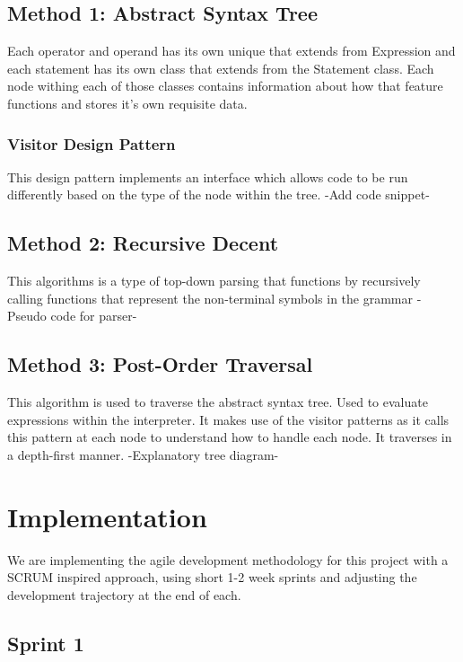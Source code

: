 \documentclass[a4paper, oneside, 11pt]{report}
\begin{document}
\section{Method 1: Abstract Syntax Tree}

Each operator and operand has its own unique that extends from Expression and each
statement has its own class that extends from the Statement class. Each node withing
each of those classes contains information about how that feature functions and stores it’s
own requisite data.

\subsection{Visitor Design Pattern}

This design pattern implements an interface which allows code to be run differently based
on the type of the node within the tree.
-Add code snippet-

\section{Method 2: Recursive Decent}

This algorithms is a type of top-down parsing that functions by recursively calling functions that represent the non-terminal symbols in the grammar
-Pseudo code for parser-

\section{Method 3: Post-Order Traversal}

This algorithm is used to traverse the abstract syntax tree. Used to evaluate expressions
within the interpreter. It makes use of the visitor patterns as it calls this pattern at each
node to understand how to handle each node. It traverses in a depth-first manner.
-Explanatory tree diagram-



\chapter{Implementation}\label{Impl}

We are implementing the agile development methodology for this project with a SCRUM inspired approach, using short 1-2 week sprints and adjusting the development trajectory at the end of each.

\section{Sprint 1}
\end{document}
